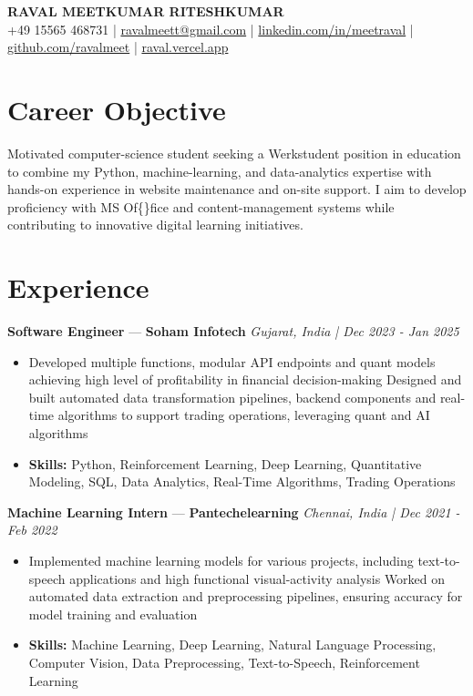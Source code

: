\documentclass[a4paper,10pt]{article}
\begin{document}
\begin{center}
  {\Large\bfseries RAVAL MEETKUMAR RITESHKUMAR}\\[2pt]
  {\small +49 15565 468731 \;|\; \href{mailto:ravalmeett@gmail.com}{ravalmeett@gmail.com} \;|\; \href{https://www.linkedin.com/in/meetraval/}{linkedin.com/in/meetraval} \;|\; \href{https://github.com/ravalmeet}{github.com/ravalmeet} \;|\; \href{https://raval.vercel.app/}{raval.vercel.app}}
\end{center}
\vspace{-3pt}

\section*{Career Objective}
Motivated computer-science student seeking a Werkstudent position in education to combine my Python, machine-learning, and data-analytics expertise with hands-on experience in website maintenance and on-site support. I aim to develop proficiency with MS Of\{\}fice and content-management systems while contributing to innovative digital learning initiatives.\par

\section*{Experience}
\textbf{Software Engineer} — \textbf{Soham Infotech} \hfill \textit{Gujarat, India \;|\; Dec 2023 - Jan 2025}\par
\vspace{1pt}
\begin{itemize}
  \item Developed multiple functions, modular API endpoints and quant models achieving high level of profitability in financial decision-making Designed and built automated data transformation pipelines, backend components and real-time algorithms to support trading operations, leveraging quant and AI algorithms
  \item \textbf{Skills:} Python, Reinforcement Learning, Deep Learning, Quantitative Modeling, SQL, Data Analytics, Real-Time Algorithms, Trading Operations
\end{itemize}
\vspace{3pt}
\textbf{Machine Learning Intern} — \textbf{Pantechelearning} \hfill \textit{Chennai, India \;|\; Dec 2021 - Feb 2022}\par
\vspace{1pt}
\begin{itemize}
  \item Implemented machine learning models for various projects, including text-to-speech applications and high functional visual-activity analysis Worked on automated data extraction and preprocessing pipelines, ensuring accuracy for model training and evaluation
  \item \textbf{Skills:} Machine Learning, Deep Learning, Natural Language Processing, Computer Vision, Data Preprocessing, Text-to-Speech, Reinforcement Learning
\end{itemize}
\end{document}
